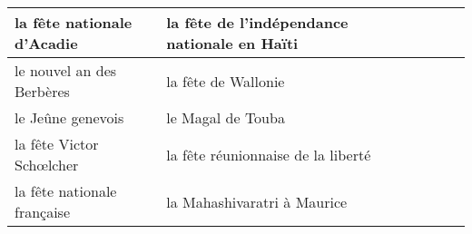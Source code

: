 \documentclass{article}
\date{}
\newcommand{\tabrowEnd}{\\}
\begin{document}
  \centering
  \noindent
  {\LARGE
    \begin{tabular}{| p{0.5\tabcolsep} | p{0.5\tabcolsep} |}
      \hline
      la fête nationale d'Acadie  & la fête de l'indépendance nationale en Haïti \tabrowEnd
      \hline
      \parbox{\linewidth}{le nouvel an des Berbères\\} & \parbox{\linewidth}{la fête de Wallonie\\} \tabrowEnd
      \hline
      \parbox{\linewidth}{le Jeûne genevois\\}           & \parbox{\linewidth}{le Magal de Touba\\} \tabrowEnd
      \hline
      la fête Victor Schœlcher    & la fête réunionnaise de la liberté \tabrowEnd
      \hline
      \parbox{\linewidth}{la fête nationale française\\} & \parbox{\linewidth}{la Mahashivaratri à Maurice\\} \tabrowEnd
      \hline
    \end{tabular}
  }
\end{document}
